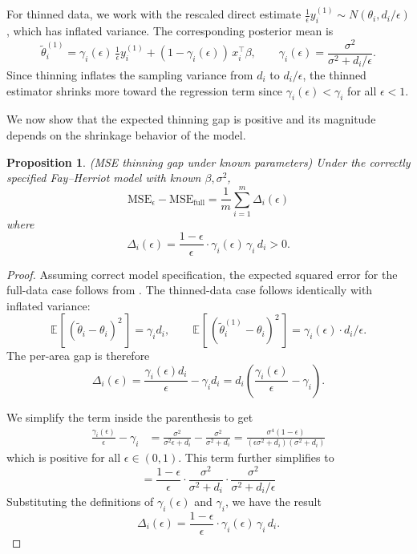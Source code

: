 \documentclass[11pt]{article}
\newcommand{\msethin}{\mathrm{MSE}_{\epsilon}}
\newcommand{\msefull}{\mathrm{MSE}_{\mathrm{full}}}
\newcommand{\E}[2][]{\mathbb{E}_{#1}\!\left[\,#2\,\right]}
\newcommand{\N}[2]{N\!\left(#1, #2\right)}
\theoremstyle{plain}
\newtheorem{proposition}[theorem]{Proposition}
\theoremstyle{definition}
\theoremstyle{remark}
\begin{document}
For thinned data, we work with the rescaled direct estimate $\tfrac{1}{\epsilon} y_i^{(1)} \sim \N{\theta_i}{d_i/\epsilon}$, which has inflated variance. The corresponding posterior mean is
\[
\tilde{\theta}_i^{(1)} = \gamma_i(\epsilon) \, \tfrac{1}{\epsilon} y_i^{(1)} + (1 - \gamma_i(\epsilon)) \, x_i^\top \beta, \qquad \gamma_i(\epsilon) = \frac{\sigma^2}{\sigma^2 + d_i/\epsilon}.
\]
Since thinning inflates the sampling variance from $d_i$ to $d_i/\epsilon$, the thinned estimator shrinks more toward the regression term since $\gamma_i(\epsilon) < \gamma_i$ for all $\epsilon < 1$.

We now show that the expected thinning gap is positive and its magnitude depends on the shrinkage behavior of the model.

\begin{proposition}
\label{prop:thinning_gap}
(MSE thinning gap under known parameters) Under the correctly specified Fay--Herriot model with known $\beta, \sigma^2$, $$\msethin - \msefull = \frac{1}{m} \sum_{i=1}^m \Delta_i(\epsilon)$$
where
\[\Delta_i(\epsilon) = \frac{1-\epsilon}{\epsilon} \cdot \gamma_i(\epsilon) \, \gamma_i \, d_i > 0.\]
\end{proposition}


\begin{proof}
Assuming correct model specification, the expected squared error for the full-data case follows from \citet{prasad_estimation_1990}. The thinned-data case follows identically with inflated variance:
\[
\E{(\tilde{\theta}_i - \theta_i)^2}= \gamma_i d_i, \qquad \E{(\tilde{\theta}_i^{(1)} - \theta_i)^2} = \gamma_i(\epsilon) \cdot d_i/\epsilon.
\]
The per-area gap is therefore
\[\Delta_i(\epsilon) = \frac{\gamma_i(\epsilon) d_i}{\epsilon} - \gamma_i d_i = d_i \left( \frac{\gamma_i(\epsilon)}{\epsilon} - \gamma_i \right).\]


We simplify the term inside the parenthesis to get
\begin{align*}
    \frac{\gamma_i(\epsilon)}{\epsilon} - \gamma_i &= \frac{\sigma^2}{\sigma^2 \epsilon + d_i} - \frac{\sigma^2}{\sigma^2 + d_i} = \frac{\sigma^4 (1-\epsilon)}{( \epsilon  \sigma^2  + d_i)(\sigma^2 + d_i)}
\end{align*}
which is positive for all $\epsilon \in (0,1)$.
This term further simplifies to
\[
= \frac{1-\epsilon}{\epsilon}  \cdot \frac{\sigma^2}{\sigma^2 + d_i}  \cdot\frac{ \sigma^2}{\sigma^2  + d_i/\epsilon}
\]
Substituting the definitions of $\gamma_i(\epsilon)$ and $\gamma_i$, we have the result
$$\Delta_i(\epsilon) = \frac{1-\epsilon}{\epsilon} \cdot \gamma_i(\epsilon) \, \gamma_i \, d_i.$$
\end{proof}
\end{document}
